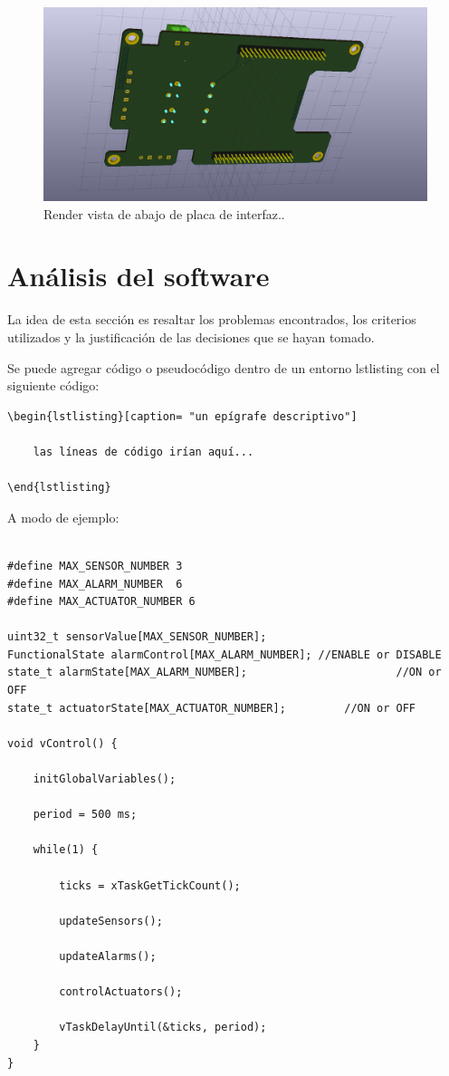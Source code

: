\begin{figure}[h!]
	\centering
	\includegraphics[width=.9\textwidth]{Figures/tempRelayPoncho_BOTTOM}
	\caption{Render vista de abajo de placa de interfaz.\protect\footnotemark.}
	\label{fig:renderPonchoBOT}
\end{figure}


\section{Análisis del software}
 
La idea de esta sección es resaltar los problemas encontrados, los criterios utilizados y la justificación de las decisiones que se hayan tomado.

Se puede agregar código o pseudocódigo dentro de un entorno lstlisting con el siguiente código:

\begin{verbatim}
\begin{lstlisting}[caption= "un epígrafe descriptivo"]

	las líneas de código irían aquí...
	
\end{lstlisting}
\end{verbatim}

A modo de ejemplo:

\begin{lstlisting}[caption=Pseudocódigo del lazo principal de control.]  % Start your code-block

#define MAX_SENSOR_NUMBER 3
#define MAX_ALARM_NUMBER  6
#define MAX_ACTUATOR_NUMBER 6

uint32_t sensorValue[MAX_SENSOR_NUMBER];		
FunctionalState alarmControl[MAX_ALARM_NUMBER];	//ENABLE or DISABLE
state_t alarmState[MAX_ALARM_NUMBER];						//ON or OFF
state_t actuatorState[MAX_ACTUATOR_NUMBER];			//ON or OFF

void vControl() {

	initGlobalVariables();
	
	period = 500 ms;
		
	while(1) {

		ticks = xTaskGetTickCount();
		
		updateSensors();
		
		updateAlarms();
		
		controlActuators();
		
		vTaskDelayUntil(&ticks, period);
	}
}
\end{lstlisting}

